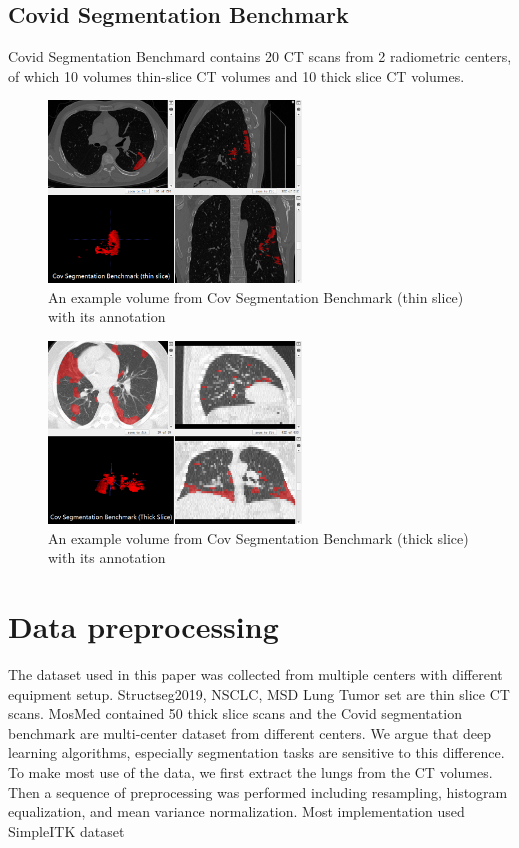 \subsection{Covid Segmentation Benchmark}
Covid Segmentation Benchmard contains 20 CT scans from 2 radiometric centers, of which 10 volumes thin-slice CT volumes and 10 thick slice CT volumes.
\begin{figure}[h]
	\centering
	\includegraphics[width=0.6\textwidth]{img/Dataset/Cov_benchmark_thin}
	\caption{An example volume from Cov Segmentation Benchmark (thin slice) with its annotation}
	\label{fig:Covseg_thin}
\end{figure}
\begin{figure}[h]
	\centering
	\includegraphics[width=0.6\textwidth]{img/Dataset/Cov_benchmark_thick}
	\caption{An example volume from Cov Segmentation Benchmark (thick slice) with its annotation}
	\label{fig:Covseg_thick}
\end{figure}


\section{Data preprocessing}
The dataset used in this paper was collected from multiple centers with different equipment setup. Structseg2019, NSCLC, MSD Lung Tumor set are thin slice CT scans. MosMed contained 50 thick slice scans and the Covid segmentation benchmark are multi-center dataset from different centers. We argue that deep learning algorithms, especially segmentation tasks are sensitive to this difference. To make most use of the data, we first extract the lungs from the CT volumes. Then a sequence of preprocessing was performed including resampling, histogram equalization, and mean variance normalization. Most implementation used SimpleITK dataset

